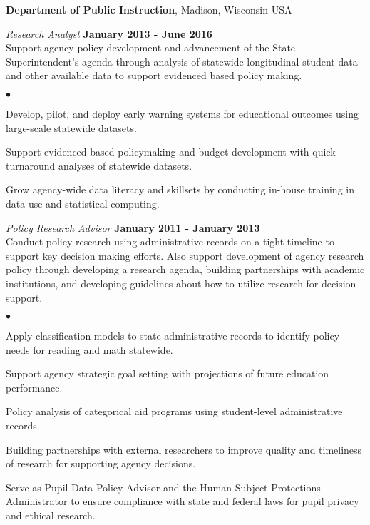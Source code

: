 \documentclass[margin,line]{res}
\newenvironment{list2}{
  \begin{list}{$\bullet$}{%
      \setlength{\itemsep}{0in}
      \setlength{\parsep}{0in} \setlength{\parskip}{0in}
      \setlength{\topsep}{0in} \setlength{\partopsep}{0in} 
      \setlength{\leftmargin}{0.2in}}}{\end{list}}
\begin{document}
\begin{resume}
\vspace{-.1cm}
{\bf Department of Public Instruction}, Madison, Wisconsin USA

{\em Research Analyst} \hfill {\bf January 2013 - June 2016}\\
Support agency policy development and advancement of the State Superintendent's agenda through analysis of statewide longitudinal student data and other available data to support evidenced based policy making. 
\begin{list2}
\item Develop, pilot, and deploy early warning systems for educational outcomes using large-scale statewide datasets. 
\item Support evidenced based policymaking and budget development with quick turnaround analyses of statewide datasets. 
\item Grow agency-wide data literacy and skillsets by conducting in-house training in data use and statistical computing.
\end{list2}

\vspace{-.3cm}
{\em Policy Research Advisor} \hfill {\bf January 2011 - January 2013}\\
Conduct policy research using administrative records on a tight timeline to support key decision making efforts. Also support development of agency research policy through developing a research agenda, building partnerships with academic institutions, and developing guidelines about how to utilize research for decision support.
\begin{list2}
\item Apply classification models to state administrative records to identify policy needs for reading and math statewide.
\item Support agency strategic goal setting with projections of future education performance.
\item Policy analysis of categorical aid programs using student-level administrative records.
\item Building partnerships with external researchers to improve quality and timeliness of research for supporting agency decisions.
\item Serve as Pupil Data Policy Advisor and the Human Subject Protections Administrator to ensure compliance with state and federal laws for pupil privacy and ethical research.
\end{list2}


\end{resume}
\end{document}
